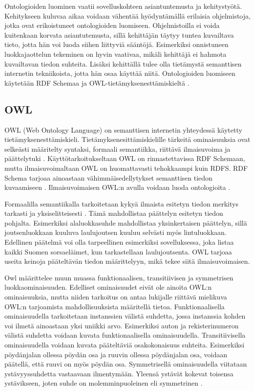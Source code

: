 \documentclass[finnish, 12pt, a4paper, elec, utf8, pdfa, online]{aaltothesis}
\begin{document}
Ontologioiden luominen vaatii sovelluskohteen asiantuntemusta ja kehitystyötä.
Kehitykseen kuluvaa aikaa voidaan vähentää hyödyntämällä erilaisia ohjelmistoja, jotka ovat erikoistuneet ontologioiden luomiseen. Ohjelmistoilla ei voida kuitenkaan korvata asiantutemusta, sillä kehittäjän täytyy tuntea kuvailtava tieto, jotta hän voi luoda siihen liittyviä sääntöjä. Esimerkiksi onnistuneen luokkajaottelun tekeminen on hyvin vaativaa, mikäli kehittäjä ei hahmota kuvailtavan tiedon suhteita. Lisäksi kehittällä tulee olla tietämystä semanttisen internetin tekniikoista, jotta hän osaa käyttää niitä. Ontologioiden luomiseen käytetään RDF Schemaa ja OWL-tietämyksenesttämiskieltä \cite{OWL_specification}.



\subsection{OWL}

OWL (Web Ontology Language) on semanttisen internetin yhteydessä käytetty tietämyksenesttämiskieli. Tietämyksenesittämiskielille tärkeitä ominaisuuksia ovat selkeästi määritelty syntaksi, formaali semantiikka, riittävä ilmaisuvoima ja päättelytuki \cite{Antoniou}. Käyttötarkoitukseltaan OWL on rinnastettavissa RDF Schemaan, mutta ilmaisuvoimaltaan OWL on huomattavasti tehokkaampi kuin RDFS. RDF Schema tarjoaa ainoastaan vähimmäisedellytykset semanttisen tiedon kuvaamiseen \cite{revisited}. Ilmaisuvoimaisen OWL:n avulla voidaan luoda ontologioita \cite{OWL_specification}.

Formaalilla semantiikalla tarkoitetaan kykyä ilmaista esitetyn tiedon merkitys tarkasti ja yksiselitteisesti \cite{Antoniou}. Tämä mahdollistaa päättelyn esitetyn tiedon pohjalta. Esimerkiksi alaluokkasuhde mahdollistaa yksinkertaisen päättelyn, sillä joutsenluokkaan kuuluva laulujoutsen kuuluu selvästi myös lintuluokkaan. Edellinen päätelmä voi olla tarpeellinen esimerkiksi sovelluksessa, joka listaa kaikki Suomen sorsaeläimet, kun tarkastellaan laulujoutsenta. OWL tarjoaa useita keinoja pääteltävän tiedon määrittelyyn, mikä tekee siitä ilmaisuvoimaisen.

Owl määrittelee muun muassa funktionaalisen, transitiivisen ja symmetrisen luokkaominaisuuden. Edelliset ominaisuudet eivät ole ainoita OWL:n ominaisuuksia, mutta niiden tarkoitus on antaa lukijalle riittävä mielikuva OWL:n tarjoamista mahdollisuuksista määritellä tietoa. Funktionaalisella ominaisuudella tarkoitetaan instanssien välistä suhdetta, jossa instanssia kohden voi ilmetä ainoastaan yksi uniikki arvo. Esimerkiksi auton ja rekisterinumeron välistä suhdetta voidaan kuvata funktionaalisella ominaisuudella. Transitiivisella ominaisuudella voidaan kuvata pääteltäviä osakokonaisuus suhteita. Esimerkiksi pöydänjalan ollessa pöydän osa ja ruuvin ollessa pöydänjalan osa, voidaan päätellä, että ruuvi on myös pöydän osa. Symmetrisellä ominaisuudella viitataan ystävyyssuhdetta vastaavaan ilmentymään. Yleensä ystävät kokevat toisensa ystävikseen, joten suhde on molemminpuoleinen eli symmetrinen \cite{OWL_specification}.
\end{document}
